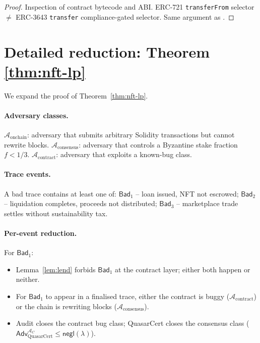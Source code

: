 \documentclass[11pt]{article}
\begin{document}
\begin{proof}
Inspection of contract bytecode and ABI. ERC-721
\texttt{transferFrom} selector $\neq$ ERC-3643
\texttt{transfer} compliance-gated selector. Same argument as
\cite[Prop. 6.1]{lux-adopts}.
\end{proof}

\section{Detailed reduction: Theorem \ref{thm:nft-lp}}
\label{sec:detail-thm}

We expand the proof of Theorem~\ref{thm:nft-lp}.

\paragraph{Adversary classes.}
$\mathcal{A}_{\mathrm{onchain}}$: adversary that submits arbitrary
Solidity transactions but cannot rewrite blocks.
$\mathcal{A}_{\mathrm{consensus}}$: adversary that controls a
Byzantine stake fraction $f < 1/3$.
$\mathcal{A}_{\mathrm{contract}}$: adversary that exploits a
known-bug class.

\paragraph{Trace events.}
A bad trace contains at least one of:
$\mathsf{Bad}_1$ -- loan issued, NFT not escrowed;
$\mathsf{Bad}_2$ -- liquidation completes, proceeds not distributed;
$\mathsf{Bad}_3$ -- marketplace trade settles without sustainability tax.

\paragraph{Per-event reduction.}

For $\mathsf{Bad}_1$:
\begin{itemize}[nosep]
  \item Lemma~\ref{lem:lend} forbids $\mathsf{Bad}_1$ at the
        contract layer; either both happen or neither.
  \item For $\mathsf{Bad}_1$ to appear in a finalised trace,
        either the contract is buggy
        ($\mathcal{A}_{\mathrm{contract}}$) or the chain is
        rewriting blocks ($\mathcal{A}_{\mathrm{consensus}}$).
  \item Audit closes the contract bug class; QuasarCert closes the
        consensus class
        ($\mathsf{Adv}_{\mathrm{QuasarCert}}^{\mathcal{A}_C}
          \leq \mathsf{negl}(\lambda)$).
\end{itemize}
\end{document}
